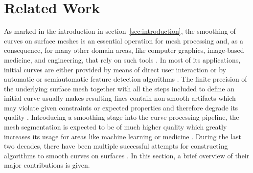 \documentclass{stdlocal}
\begin{document}
\section{Related Work} %
\label{sec:previous_work}

As marked in the introduction in section~\ref{sec:introduction}, the smoothing of curves on surface meshes is an essential operation for mesh processing and, as a consequence, for many other domain areas, like computer graphics, image-based medicine, and engineering, that rely on such tools \autocite{ji2006,kaplansky2009}.
In most of its applications, initial curves are either provided by means of direct user interaction or by automatic or semiautomatic feature detection algorithms \autocite{zachow2003,lawonn2014}.
The finite precision of the underlying surface mesh together with all the steps included to define an initial curve usually makes resulting lines contain non-smooth artifacts which may violate given constraints or expected properties and therefore degrade its quality \autocite{kaplansky2009,lawonn2014}.
Introducing a smoothing stage into the curve processing pipeline, the mesh segmentation is expected to be of much higher quality which greatly increases its usage for areas like machine learning \autocite{benhabiles2011} or medicine \autocite{zachow2003,alirr2019}.
During the last two decades, there have been multiple successful attempts for constructing algorithms to smooth curves on surfaces \autocite{hofer2004,bischoff2005,lawonn2014,mancinelli2022}.
In this section, a brief overview of their major contributions is given.
\end{document}
